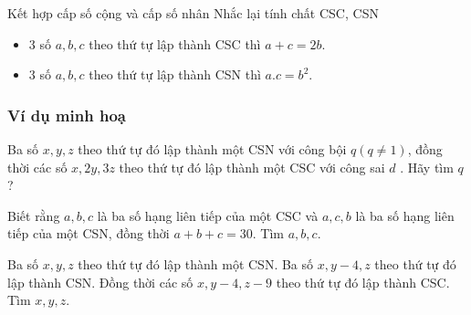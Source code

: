 \begin{dang}{Kết hợp cấp số cộng và cấp số nhân}
	Nhắc lại tính chất CSC, CSN
	\begin{itemize}
		\item $3$ số $a,b,c$ theo thứ tự lập thành CSC thì $a+c=2b$.
		\item $3$ số $a,b,c$ theo thứ tự lập thành CSN thì $a.c=b^2$.
	\end{itemize}
\end{dang}
\subsubsection{Ví dụ minh hoạ}
\begin{vd}%
	Ba số $x, y, z$ theo thứ tự đó lập thành một CSN với công bội $q (q\ne 1)$, đồng thời các số $x, 2y, 3z$ theo thứ tự đó lập thành một CSC với công sai $d$ . Hãy tìm $q$?
\end{vd}

\begin{vd}%
	Biết rằng $a, b, c$ là ba số hạng liên tiếp của một CSC và $a, c, b$ là ba số hạng liên tiếp của một CSN, đồng thời $a+b+c=30$. Tìm $a,b,c$.
\end{vd}

\begin{vd}%
	Ba số $x, y, z$ theo thứ tự đó lập thành một CSN. Ba số $x, y-4 , z$ theo thứ tự đó lập thành CSN. Đồng thời các số $x, y-4 , z-9$ theo thứ tự đó lập thành CSC. Tìm $x,y,z$.
	
\end{vd}

